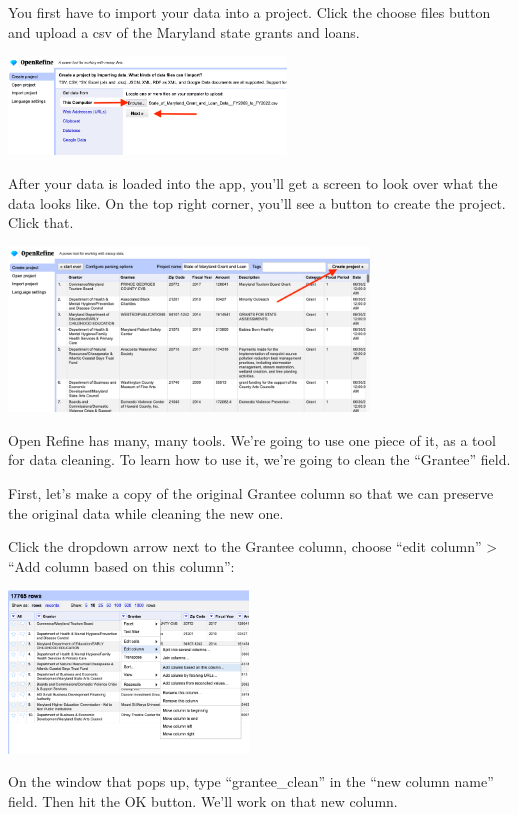 \documentclass[
  letterpaper,
  DIV=11,
  numbers=noendperiod]{scrreprt}
\begin{document}
You first have to import your data into a project. Click the choose
files button and upload a csv of the Maryland state grants and loans.

\includegraphics[width=2.91in,height=\textheight]{./images/open1.png}

After your data is loaded into the app, you'll get a screen to look over
what the data looks like. On the top right corner, you'll see a button
to create the project. Click that.

\includegraphics[width=3.77in,height=\textheight]{./images/open2.png}

Open Refine has many, many tools. We're going to use one piece of it, as
a tool for data cleaning. To learn how to use it, we're going to clean
the ``Grantee'' field.

First, let's make a copy of the original Grantee column so that we can
preserve the original data while cleaning the new one.

Click the dropdown arrow next to the Grantee column, choose ``edit
column'' \textgreater{} ``Add column based on this column'':

\includegraphics[width=2.51in,height=\textheight]{./images/open2a.png}

On the window that pops up, type ``grantee\_clean'' in the ``new column
name'' field. Then hit the OK button. We'll work on that new column.
\end{document}
